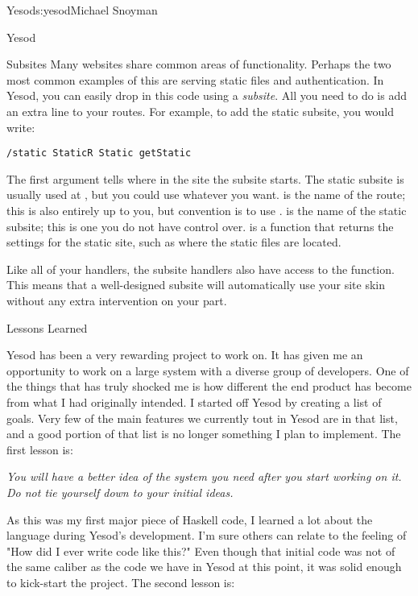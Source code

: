 \begin{aosachapter}{Yesod}{s:yesod}{Michael Snoyman}
\begin{aosasect1}{Yesod}
\begin{aosasect2}{Subsites}
Many websites share common areas of functionality. Perhaps the two
most common examples of this are serving static files and
authentication. In Yesod, you can easily drop in this code using a
\emph{subsite}. All you need to do is add an extra line to your
routes. For example, to add the static subsite, you would write:

\begin{verbatim}
/static StaticR Static getStatic
\end{verbatim}

The first argument tells where in the site the subsite starts. The
static subsite is usually used at , but you could use whatever
you want.  is the name of the route; this is also entirely up
to you, but convention is to use .  is the name of the
static subsite; this is one you do not have control
over.  is a function that returns the settings for the
static site, such as where the static files are located.

Like all of your handlers, the subsite handlers also have access to
the  function. This means that a well-designed
subsite will automatically use your site skin without any extra
intervention on your part.

\end{aosasect2}

\end{aosasect1}

\begin{aosasect1}{Lessons Learned}

Yesod has been a very rewarding project to work on. It has given me an
opportunity to work on a large system with a diverse group of
developers. One of the things that has truly shocked me is how
different the end product has become from what I had originally
intended. I started off Yesod by creating a list of goals. Very few of
the main features we currently tout in Yesod are in that list, and a
good portion of that list is no longer something I plan to
implement. The first lesson is:

\emph{You will have a better idea of the system you need after you
  start working on it. Do not tie yourself down to your initial
  ideas.}

As this was my first major piece of Haskell code, I learned a lot
about the language during Yesod's development. I'm sure others can
relate to the feeling of "How did I ever write code like this?" Even
though that initial code was not of the same caliber as the code we
have in Yesod at this point, it was solid enough to kick-start the
project. The second lesson is:


\end{aosasect1}
\end{aosachapter}
